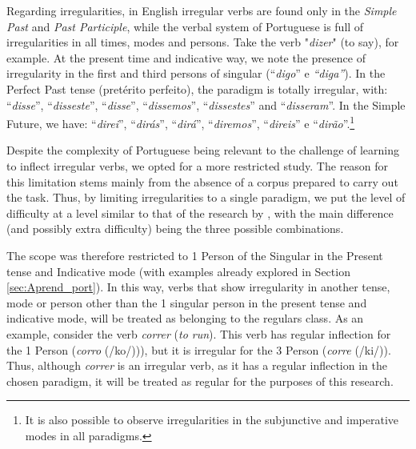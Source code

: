Regarding irregularities, in English irregular verbs are found only in the \textit{Simple Past} and \textit{Past Participle}, while the verbal system of Portuguese is full of irregularities in all times, modes and persons. Take the verb "\textit{dizer}" (to say), for example. At the present time and indicative way, we note the presence of irregularity in the first and third persons of singular (“\textit{digo}” e \textit{“diga”}). In the Perfect Past tense (pretérito perfeito), the paradigm is totally irregular, with: “\textit{disse}”, “\textit{disseste}”, “\textit{disse}”, “\textit{dissemos}”, “\textit{dissestes}” and “\textit{disseram}”. In the Simple Future, we have: “\textit{direi}”, “\textit{dirás}”, “\textit{dirá}”, “\textit{diremos}”, “\textit{direis}” e “\textit{dirão}”.\footnote{It is also possible to observe irregularities in the subjunctive and imperative modes in all paradigms.} 

Despite the complexity of Portuguese being relevant to the challenge of learning to inflect irregular verbs, we opted for a more restricted study. The reason for this limitation stems mainly from the absence of a corpus prepared to carry out the task. Thus, by limiting irregularities to a single paradigm, we put the level of difficulty at a level similar to that of the research by \cite{rumelhart:1986}, with the main difference (and possibly extra difficulty) being the three possible combinations.

The scope was therefore restricted to 1 Person of the Singular in the Present tense and Indicative mode (with examples already explored in Section \ref{sec:Aprend_port}). In this way, verbs that show irregularity in another tense, mode or person other than the 1 singular person in the present tense and indicative mode, will be treated as belonging to the regulars class. As an example, consider the verb \textit{correr} (\textit{to run}). This verb has regular inflection for the 1 Person (\textit{corro} (/ko\textupsilon/))), but it is irregular for the 3  Person (\textit{corre} (/k\textopeno{}i/)). Thus, although \textit{correr} is an irregular verb, as it has a regular inflection in the chosen paradigm, it will be treated as regular for the purposes of this research. 
